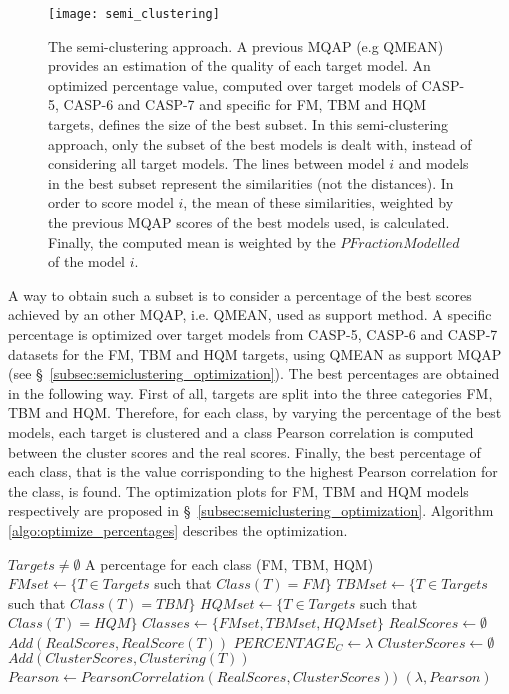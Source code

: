 \begin{figure}[tb]
	\begin{center}
		\texttt{[image: semi\_clustering]}
		\caption[The semi-clustering approach]{The semi-clustering approach. A previous MQAP (e.g QMEAN) provides an estimation of the quality of each target model. An optimized percentage value, computed over target models of CASP-5, CASP-6 and CASP-7 and specific for FM, TBM and HQM targets, defines the size of the best subset. In this semi-clustering approach, only the subset of the best models is dealt with, instead of considering all target models. The lines between model $i$ and models in the best subset represent the similarities (not the distances). In order to score model $i$, the mean of these similarities, weighted by the previous MQAP scores of the best models used, is calculated. Finally, the computed mean is weighted by the $PFractionModelled$ of the model $i$.}
		\label{fig:semi_clustering}
	\end{center}
\end{figure}
A way to obtain such a subset is to consider a percentage of the best scores achieved by an other MQAP, i.e. QMEAN, used as support method. A specific percentage is optimized over target models from CASP-5, CASP-6 and CASP-7 datasets for the FM, TBM and HQM targets, using QMEAN as support MQAP (see \S~\ref{subsec:semiclustering_optimization}). The best percentages are obtained in the following way. First of all, targets are split into the three categories FM, TBM and HQM. Therefore, for each class, by varying the percentage of the best models, each target is clustered and a class Pearson correlation is computed between the cluster scores and the real scores. Finally, the best percentage of each class, that is the value corrisponding to the highest Pearson correlation for the class, is found. The optimization plots for FM, TBM and HQM models respectively are proposed in \S~\ref{subsec:semiclustering_optimization}. Algorithm \ref{algo:optimize_percentages} describes the optimization.\\
\begin{algorithm}
\caption{$OptimizePercentages(Targets)$}
\label{algo:optimize_percentages}
\begin{algorithmic}[1]
\REQUIRE $Targets \neq \emptyset$
\ENSURE A percentage for each class (FM, TBM, HQM)
\STATE $FMset \leftarrow \{T \in Targets$ such that $Class(T) = FM\}$
\STATE $TBMset \leftarrow \{T \in Targets$ such that $Class(T) = TBM\}$
\STATE $HQMset \leftarrow \{T \in Targets$ such that $Class(T) = HQM\}$
\STATE $Classes \leftarrow \{FMset, TBMset, HQMset\}$
	\STATE $RealScores \leftarrow \emptyset$
		\STATE $Add(RealScores, RealScore(T))$
	\ENDFOR	
		\STATE $PERCENTAGE_C \leftarrow \lambda$
		\STATE $ClusterScores \leftarrow \emptyset$
			\STATE $Add(ClusterScores, Clustering(T))$
		\ENDFOR
		\STATE $Pearson \leftarrow PearsonCorrelation(RealScores, ClusterScores))$
		\PRINT $(\lambda, Pearson)$
	\ENDFOR
\ENDFOR
\end{algorithmic}
\end{algorithm}
